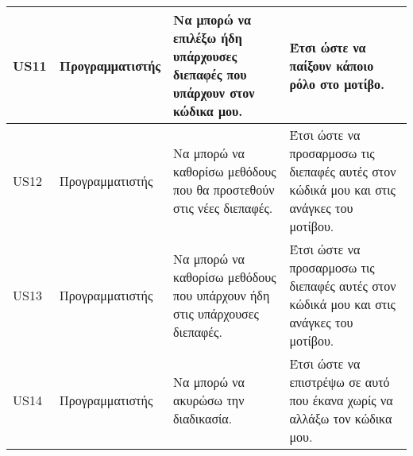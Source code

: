 \documentclass[../diploma_thesis.tex]{subfiles}
\begin{document}
\begin{table}[H]
\begin{adjustbox}{width=1.7\textwidth}
\begin{tabular}{|l|l|l|l|}
        US11 & Προγραμματιστής & Να μπορώ να επιλέξω ήδη υπάρχουσες διεπαφές που υπάρχουν στον κώδικα μου.  & Έτσι ώστε να παίξουν κάποιο ρόλο στο μοτίβο. \\ \hline
        US12 & Προγραμματιστής & Να μπορώ να καθορίσω μεθόδους που θα προστεθούν στις νέες διεπαφές. & Έτσι ώστε να προσαρμοσω τις διεπαφές αυτές στον κώδικά μου και στις ανάγκες του μοτίβου. \\ \hline
        US13 & Προγραμματιστής & Να μπορώ να καθορίσω μεθόδους που υπάρχουν ήδη στις υπάρχουσες διεπαφές. & Έτσι ώστε να προσαρμοσω τις διεπαφές αυτές στον κώδικά μου και στις ανάγκες του μοτίβου. \\ \hline
        US14 & Προγραμματιστής & Να μπορώ να ακυρώσω την διαδικασία. & Έτσι ώστε να επιστρέψω σε αυτό που έκανα χωρίς να αλλάξω τον κώδικα μου. \\ \hline
    \end{tabular}
    \end{adjustbox}
\end{table}
\end{document}

